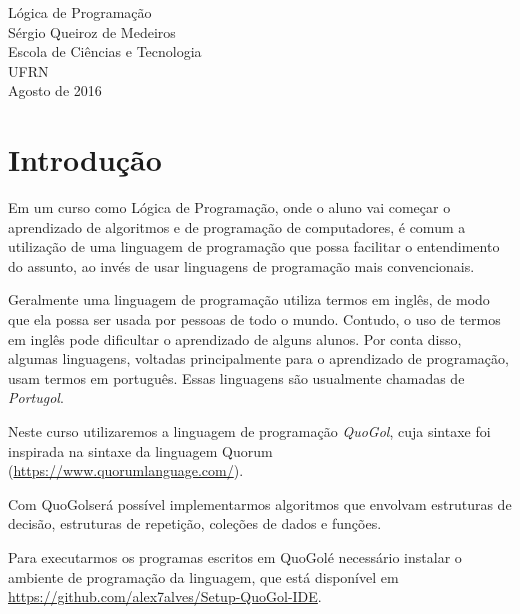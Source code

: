 \documentclass{report}
\newcommand{\Qgol}{QuoGol\;}
\begin{document}
\thispagestyle{empty}
\begin{center}

\begin{center}
\end{center}
\vspace{6cm}
\Huge{Lógica de Programação}\\
\vspace{1.5cm}
\Large{Sérgio Queiroz de Medeiros} \\
\Large{Escola de Ciências e Tecnologia} \\
\Large{UFRN}
\vspace{5cm}
\\
\large{Agosto de 2016}
\end{center}


\pagebreak




\chapter{Introdução}

Em um curso como Lógica de Programação, onde o aluno
vai começar o aprendizado de algoritmos e de programação
de computadores, é comum a utilização de uma linguagem
de programação que possa facilitar o entendimento do
assunto, ao invés de usar linguagens de programação
mais convencionais.

Geralmente uma linguagem de programação utiliza termos em inglês,
de modo que ela possa ser usada por pessoas de todo o mundo.
Contudo, o uso de termos em inglês pode dificultar o aprendizado
de alguns alunos. Por conta disso, algumas linguagens, voltadas
principalmente para o aprendizado de programação, usam termos em
português. Essas linguagens são usualmente chamadas de \emph{Portugol}.

Neste curso utilizaremos a linguagem de programação \emph{\Qgol},
cuja sintaxe foi inspirada na sintaxe da linguagem Quorum
(\url{https://www.quorumlanguage.com/}).

Com \Qgol será possível implementarmos algoritmos que envolvam
estruturas de decisão, estruturas de repetição, coleções de dados
e funções.

Para executarmos os programas escritos em \Qgol é necessário
instalar o ambiente de programação da linguagem, que está disponível em
\url{https://github.com/alex7alves/Setup-QuoGol-IDE}.
\end{document}
